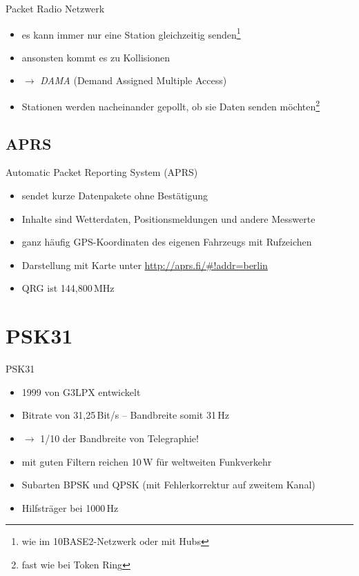 \begin{frame}{Packet Radio Netzwerk}
  \begin{itemize}
    \item es kann immer nur eine Station gleichzeitig senden\footnote{wie im 10BASE2-Netzwerk oder mit Hubs}
    \item ansonsten kommt es zu Kollisionen
    \item $\rightarrow$ \emph{DAMA} (Demand Assigned Multiple Access)
    \item Stationen werden nacheinander gepollt, ob sie Daten senden möchten\footnote{fast wie bei Token Ring}
  \end{itemize}
\end{frame}

\subsection{APRS}
\begin{frame}{Automatic Packet Reporting System (APRS)}
  \begin{itemize}
    \item sendet kurze Datenpakete ohne Bestätigung
    \item Inhalte sind Wetterdaten, Positionsmeldungen und andere Messwerte
    \item ganz häufig GPS-Koordinaten des eigenen Fahrzeugs mit Rufzeichen
    \item Darstellung mit Karte unter \url{http://aprs.fi/\#!addr=berlin}
    \item QRG ist 144,800\,MHz
  \end{itemize}
\end{frame}

\section{PSK31}
\begin{frame}{PSK31}
  \begin{itemize}
    \item 1999 von G3LPX entwickelt
    \item Bitrate von 31,25\,Bit/s -- Bandbreite somit 31\,Hz
    \item $\rightarrow$ 1/10 der Bandbreite von Telegraphie!
    \item mit guten Filtern reichen 10\,W für weltweiten Funkverkehr
    \item Subarten BPSK und QPSK (mit Fehlerkorrektur auf zweitem Kanal)
    \item Hilfsträger bei 1000\,Hz
  \end{itemize}
\end{frame}

